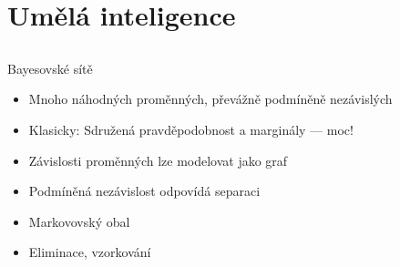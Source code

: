 \documentclass{beamer}
\begin{document}
\subsection{}

\section{Umělá inteligence}

\subsection{}
\begin{frame}{Bayesovské sítě}
\begin{itemize}
\item Mnoho náhodných proměnných, převážně podmíněně nezávislých
\item Klasicky: Sdružená pravděpodobnost a marginály --- moc!
\item Závislosti proměnných lze modelovat jako graf
\item Podmíněná nezávislost odpovídá separaci
\item Markovovský obal
\item Eliminace, vzorkování
\end{itemize}
\end{frame}
\end{document}
